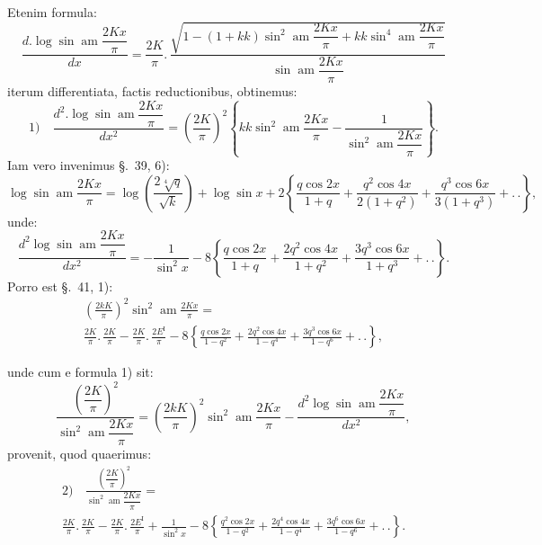 \documentclass{article}
\begin{document}
Etenim formula:
\[
\frac{d.\log\sin\operatorname{am}\dfrac{2Kx}{\pi}}{dx}=\frac{2K}{\pi}.\,\frac{\sqrt{1-(1+kk)\sin^{2}\operatorname{am}\dfrac{2Kx}{\pi}+kk\sin^{4}\operatorname{am}\dfrac{2Kx}{\pi}}}{\sin\operatorname{am}\dfrac{2Kx}{\pi}}
\]
iterum differentiata, factis reductionibus, obtinemus:
\[
\text{1)}\quad\frac{d^{2}.\log\sin\operatorname{am}\dfrac{2Kx}{\pi}}{dx^{2}}=\left(\frac{2K}{\pi}\right)^{2}\left\{kk\sin^{2}\operatorname{am}\frac{2Kx}{\pi}-\frac{1}{\sin^{2}\operatorname{am}\dfrac{2Kx}{\pi}}\right\}.
\]
Iam vero invenimus §.\ 39, 6):
\[
\log\sin\operatorname{am}\frac{2Kx}{\pi}=\log\left(\frac{2\sqrt[4]{q}}{\sqrt{k}}\right)+\log\sin x+2\left\{\frac{q\cos 2x}{1+q}+\frac{q^{2}\cos 4x}{2(1+q^{2})}+\frac{q^{3}\cos 6x}{3(1+q^{3})}+.\,.\right\},
\]
unde:
\[
\frac{d^{2}\log\sin\operatorname{am}\dfrac{2Kx}{\pi}}{dx^{2}}=-\frac{1}{\sin^{2}x}-8\left\{\frac{q\cos 2x}{1+q}+\frac{2q^{2}\cos 4x}{1+q^{2}}+\frac{3q^{3}\cos 6x}{1+q^{3}}+.\,.\right\}.
\]
Porro est §.\ 41, 1):
\[
\begin{gathered}
\left(\frac{2kK}{\pi}\right)^{2}\sin^{2}\operatorname{am}\frac{2Kx}{\pi}=\\[1.5ex]
\frac{2K}{\pi}.\,\frac{2K}{\pi}-\frac{2K}{\pi}.\,\frac{2E^{\mathrm{I}}}{\pi}-8\left\{\frac{q\cos 2x}{1-q^{2}}+\frac{2q^{2}\cos 4x}{1-q^{4}}+\frac{3q^{3}\cos 6x}{1-q^{6}}+.\,.\right\},
\end{gathered}
\]

unde cum e formula 1) sit:
\[
\frac{\left(\dfrac{2K}{\pi}\right)^{2}}{\sin^{2}\operatorname{am}\dfrac{2Kx}{\pi}}=\left(\frac{2kK}{\pi}\right)^{2}\sin^{2}\operatorname{am}\frac{2Kx}{\pi}-\frac{d^{2}\log\sin\operatorname{am}\dfrac{2Kx}{\pi}}{dx^{2}},
\]
provenit, quod quaerimus:
\[
\begin{gathered}
\text{2)}\quad\frac{\left(\dfrac{2K}{\pi}\right)^{2}}{\sin^{2}\operatorname{am}\dfrac{2Kx}{\pi}}=\\[1.5ex]
\frac{2K}{\pi}.\,\frac{2K}{\pi}-\frac{2K}{\pi}.\,\frac{2E^{\mathrm{I}}}{\pi}+\frac{1}{\sin^{2}x}-8\left\{\frac{q^{2}\cos 2x}{1-q^{2}}+\frac{2q^{4}\cos 4x}{1-q^{4}}+\frac{3q^{6}\cos 6x}{1-q^{6}}+.\,.\right\}.
\end{gathered}
\]
\end{document}
